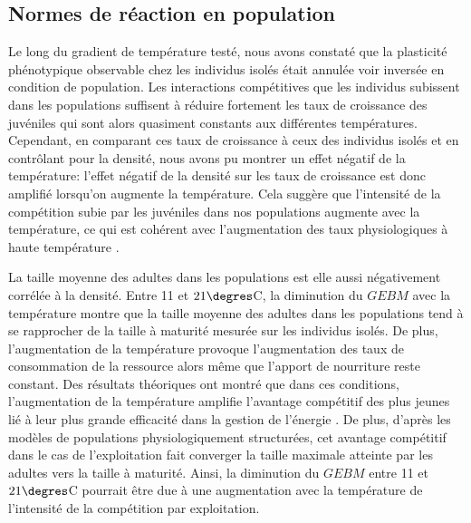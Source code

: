 \subsection{Normes de réaction en population}

Le long du gradient de température testé, nous avons constaté que la plasticité
phénotypique observable chez les individus isolés était annulée voir inversée en
condition de population. Les interactions compétitives que les individus
subissent dans les populations suffisent à réduire fortement les taux de
croissance des juvéniles qui sont alors quasiment constants aux différentes
températures. Cependant, en comparant ces taux de croissance à ceux des
individus isolés et en contrôlant pour la densité, nous avons pu montrer un
effet négatif de la température: l'effet négatif de la densité sur les taux de
croissance est donc amplifié lorsqu'on augmente la température. Cela suggère que
l'intensité de la compétition subie par les juvéniles dans nos populations
augmente avec la température, ce qui est cohérent avec l'augmentation des taux
physiologiques à haute température \autocites{gillooly2001a}.

La taille moyenne des adultes dans les populations est elle aussi négativement
corrélée à la densité. Entre 11 et $21\degres$C, la diminution du $GEBM$ avec la
température montre que la taille moyenne des adultes dans les populations tend à
se rapprocher de la taille à maturité mesurée sur les individus isolés. De plus,
l'augmentation de la température provoque l'augmentation des taux de
consommation de la ressource alors même que l'apport de nourriture reste
constant. Des résultats théoriques ont montré que dans ces conditions,
l'augmentation de la température amplifie l'avantage compétitif des plus jeunes
lié à leur plus grande efficacité dans la gestion de l'énergie
\autocites{ohlberger2011a}.
De plus, d'après les modèles de populations physiologiquement structurées, cet
avantage compétitif dans le cas de l'exploitation fait converger la taille
maximale atteinte par les adultes vers la taille à maturité. Ainsi, la
diminution du $GEBM$ entre 11 et $21\degres$C pourrait être due à une
augmentation avec la température de l'intensité de la compétition par
exploitation. 

